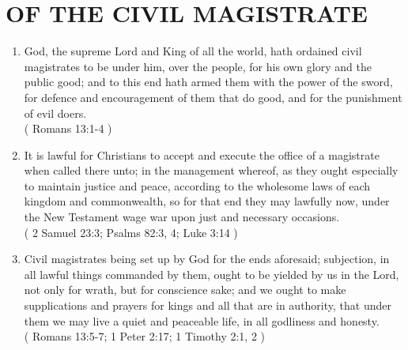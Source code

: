 \documentclass[12pt,a4paper]{book}
\begin{document}
\chapter{OF THE CIVIL MAGISTRATE}
\label{ch-civ-maj}
\begin{enumerate}
\item God, the supreme Lord and King of all the world, hath ordained civil magistrates to be under him, over the people, for his own glory and the public good; and to this end hath armed them with the power of the sword, for defence and encouragement of them that do good, and for the punishment of evil doers.\\
( Romans 13:1-4 )
\item It is lawful for Christians to accept and execute the office of a magistrate when called there unto; in the management whereof, as they ought especially to maintain justice and peace, according to the wholesome laws of each kingdom and commonwealth, so for that end they may lawfully now, under the New Testament wage war upon just and necessary occasions.\\
( 2 Samuel 23:3; Psalms 82:3, 4; Luke 3:14 )
\item Civil magistrates being set up by God for the ends aforesaid; subjection, in all lawful things commanded by them, ought to be yielded by us in the Lord, not only for wrath, but for conscience sake; and we ought to make supplications and prayers for kings and all that are in authority, that under them we may live a quiet and peaceable life, in all godliness and honesty.\\
( Romans 13:5-7; 1 Peter 2:17; 1 Timothy 2:1, 2 )
\end{enumerate}
\end{document}

